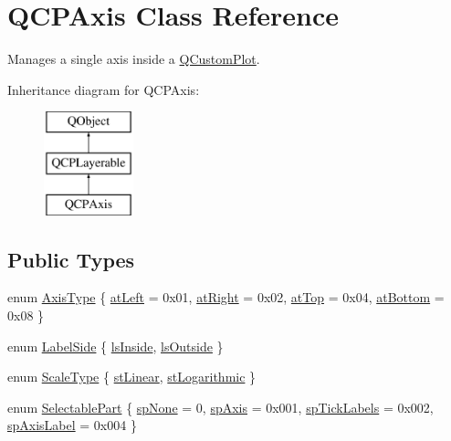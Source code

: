 \hypertarget{class_q_c_p_axis}{}\section{Q\+C\+P\+Axis Class Reference}
\label{class_q_c_p_axis}


Manages a single axis inside a \hyperlink{class_q_custom_plot}{Q\+Custom\+Plot}.  


Inheritance diagram for Q\+C\+P\+Axis\+:\begin{figure}[H]
\begin{center}
\leavevmode
\includegraphics[height=3.000000cm]{class_q_c_p_axis}
\end{center}
\end{figure}
\subsection*{Public Types}
\begin{DoxyCompactItemize}
\item 
enum \hyperlink{class_q_c_p_axis_ae2bcc1728b382f10f064612b368bc18a}{Axis\+Type} \{ \hyperlink{class_q_c_p_axis_ae2bcc1728b382f10f064612b368bc18aaf84aa6cac6fb6099f54a2cbf7546b730}{at\+Left} = 0x01, 
\hyperlink{class_q_c_p_axis_ae2bcc1728b382f10f064612b368bc18aadf5509f7d29199ef2f263b1dd224b345}{at\+Right} = 0x02, 
\hyperlink{class_q_c_p_axis_ae2bcc1728b382f10f064612b368bc18aac0ece2b680d3f545e701f75af1655977}{at\+Top} = 0x04, 
\hyperlink{class_q_c_p_axis_ae2bcc1728b382f10f064612b368bc18aa220d68888516b6c3b493d144f1ba438f}{at\+Bottom} = 0x08
 \}
\item 
enum \hyperlink{class_q_c_p_axis_a24b13374b9b8f75f47eed2ea78c37db9}{Label\+Side} \{ \hyperlink{class_q_c_p_axis_a24b13374b9b8f75f47eed2ea78c37db9aae7b027ac2839cf4ad611df30236fc3f}{ls\+Inside}, 
\hyperlink{class_q_c_p_axis_a24b13374b9b8f75f47eed2ea78c37db9a2eadb509fc0c9a8b35b85c86ec9f3c7a}{ls\+Outside}
 \}
\item 
enum \hyperlink{class_q_c_p_axis_a36d8e8658dbaa179bf2aeb973db2d6f0}{Scale\+Type} \{ \hyperlink{class_q_c_p_axis_a36d8e8658dbaa179bf2aeb973db2d6f0aff6e30a11a828bc850caffab0ff994f6}{st\+Linear}, 
\hyperlink{class_q_c_p_axis_a36d8e8658dbaa179bf2aeb973db2d6f0abf5b785ad976618816dc6f79b73216d4}{st\+Logarithmic}
 \}
\item 
enum \hyperlink{class_q_c_p_axis_abee4c7a54c468b1385dfce2c898b115f}{Selectable\+Part} \{ \hyperlink{class_q_c_p_axis_abee4c7a54c468b1385dfce2c898b115fae0df8123a5528d5ccf87cb7794f971ea}{sp\+None} = 0, 
\hyperlink{class_q_c_p_axis_abee4c7a54c468b1385dfce2c898b115fa8949d2c1a31eccae9be7ed32e7a1ae38}{sp\+Axis} = 0x001, 
\hyperlink{class_q_c_p_axis_abee4c7a54c468b1385dfce2c898b115fa584e0a3dc4d064880647619f4bd4e771}{sp\+Tick\+Labels} = 0x002, 
\hyperlink{class_q_c_p_axis_abee4c7a54c468b1385dfce2c898b115fa851e0600e0d08b4f5fee9361e3fedabd}{sp\+Axis\+Label} = 0x004
 \}
\end{DoxyCompactItemize}
